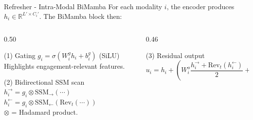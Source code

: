 \documentclass[aspectratio=169]{beamer}
\newcommand{\R}{\mathbb{R}}
\begin{document}
	\begin{frame}{Refresher - Intra-Modal BiMamba}
		For each modality $i$, the encoder produces $h_i \in \R^{L' \times C_i'}$. The BiMamba block then:
		
		\vspace{0.3em}
		\begin{columns}[onlytextwidth]
			\begin{column}{0.50\textwidth}
				\begin{block}{(1) Gating}
					\small $g_i = \sigma(W_i^g h_i + b_i^g)$ \quad (SiLU) \\
					Highlights engagement-relevant features.
				\end{block}
				\begin{block}{(2) Bidirectional SSM scan}
					\small
					$h_i^{\rightarrow} = g_i \otimes \mathrm{SSM}_{\rightarrow}(\cdots)$ \\
					$h_i^{\leftarrow} = g_i \otimes \mathrm{SSM}_{\leftarrow}(\mathrm{Rev}_t(\cdots))$ \\
					$\otimes$ = Hadamard product.
				\end{block}
			\end{column}
			\begin{column}{0.46\textwidth}
				\begin{block}{(3) Residual output}
					\small
					$$ u_i = h_i + \left(W_i^o \frac{h_i^{\rightarrow} + \mathrm{Rev}_t(h_i^{\leftarrow})}{2} + b_i^o\right) $$
				\end{block}
				\vspace{0.3em}
			\end{column}
		\end{columns}
	\end{frame}
	
\end{document}
